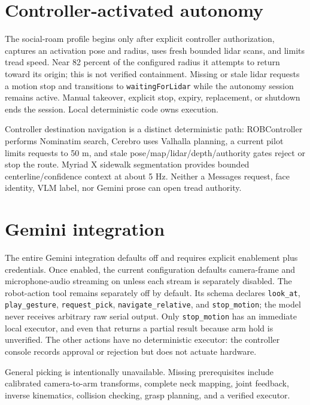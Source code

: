 \documentclass[10pt,openany]{book}
\begin{document}
\section{Controller-activated autonomy}

\Experimental\quad The social-roam profile begins only after explicit controller authorization, captures an activation pose and radius, uses fresh bounded lidar scans, and limits tread speed. Near 82 percent of the configured radius it attempts to return toward its origin; this is not verified containment. Missing or stale lidar requests a motion stop and transitions to \texttt{waitingForLidar} while the autonomy session remains active. Manual takeover, explicit stop, expiry, replacement, or shutdown ends the session. Local deterministic code owns execution.

Controller destination navigation is a distinct deterministic path: ROBController performs Nominatim search, Cerebro uses Valhalla planning, a current pilot limits requests to 50 m, and stale pose/map/lidar/depth/authority gates reject or stop the route. Myriad X sidewalk segmentation provides bounded centerline/confidence context at about 5 Hz. Neither a Messages request, face identity, VLM label, nor Gemini prose can open tread authority.

\section{Gemini integration}

\Experimental\quad The entire Gemini integration defaults off and requires explicit enablement plus credentials. Once enabled, the current configuration defaults camera-frame and microphone-audio streaming on unless each stream is separately disabled. The robot-action tool remains separately off by default. Its schema declares \texttt{look\_at}, \texttt{play\_gesture}, \texttt{request\_pick}, \texttt{navigate\_relative}, and \texttt{stop\_motion}; the model never receives arbitrary raw serial output. Only \texttt{stop\_motion} has an immediate local executor, and even that returns a partial result because arm hold is unverified. The other actions have no deterministic executor: the controller console records approval or rejection but does not actuate hardware.

\Planned\quad General picking is intentionally unavailable. Missing prerequisites include calibrated camera-to-arm transforms, complete neck mapping, joint feedback, inverse kinematics, collision checking, grasp planning, and a verified executor.
\end{document}
